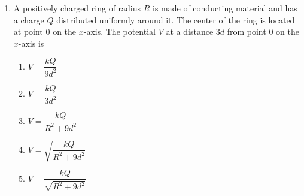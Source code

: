 \documentclass{../../../oss-apphys}
\begin{document}
\begin{multicols}{2}
\begin{enumerate}[leftmargin=18pt,resume]
  \item A positively charged ring of radius $R$ is made of conducting material
    and has a charge $Q$ distributed uniformly around it. The center of the
    ring is located at point $0$ on the $x$-axis. The potential $V$ at a
    distance $3d$ from point $0$ on the $x$-axis is
    \begin{center}
      \vspace{-.1in}
    \end{center}

    \begin{enumerate}[itemsep=4.5pt,leftmargin=18pt,label=(\Alph*)]  
    \item $\displaystyle V=\dfrac{kQ}{9d^2}$
    \item $\displaystyle V=\dfrac{kQ}{3d^2}$
    \item $\displaystyle V=\dfrac{kQ}{R^2+9d^2}$
    \item $\displaystyle V=\sqrt{\dfrac{kQ}{R^2+9d^2}}$
    \item $\displaystyle V=\dfrac{kQ}{\sqrt{R^2+9d^2}}$
    \end{enumerate}
  \end{enumerate}
\end{multicols}
\newpage


\genfreedirections
\end{document}

